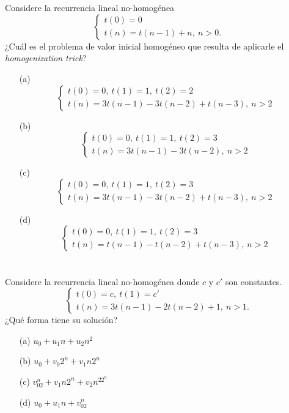 \documentclass{amsart}
\begin{document}
%

\section{} Considere la recurrencia lineal no-homogénea
\[
	\begin{cases}
		t(0)= 0\\
		t(n)= t(n-1) + n,\ n > 0.
	\end{cases}
\]
¿Cuál es el problema de valor inicial homogéneo que resulta de aplicarle el
\emph{homogenization trick}?
\begin{enumerate}
	\item[(a)]
		\[
			\begin{cases}
				t(0)= 0,\ t(1)= 1,\ t(2)= 2\\
				t(n)= 3t(n-1) - 3t(n-2) + t(n-3),\ n > 2
			\end{cases}
		\]
	\item[(b)]
		\[
			\begin{cases}
				t(0)= 0,\ t(1)= 1,\ t(2)= 3\\
				t(n)= 3t(n-1) - 3t(n-2),\ n > 2
			\end{cases}
		\]
	\item[(c)]
		\[
			\begin{cases}
				t(0)= 0,\ t(1)= 1,\ t(2)= 3\\
				t(n)= 3t(n-1) - 3t(n-2) + t(n-3),\ n > 2
			\end{cases}
		\]
	\item[(d)]
		\[
			\begin{cases}
				t(0)= 0,\ t(1)= 1,\ t(2)= 3\\
				t(n)= t(n-1) - t(n-2) + t(n-3),\ n > 2
			\end{cases}
		\]
\end{enumerate}

%

\section{} Considere la recurrencia lineal no-homogénea donde $c$ y
$c'$ son constantes.
\[
	\begin{cases}
		t(0)= c,\ t(1)= c'\\
		t(n)= 3t(n-1) - 2t(n-2) + 1,\ n > 1.
	\end{cases}
\]
¿Qué forma tiene su solución?
\begin{enumerate}
	\item[(a)] $u_0 + u_1n + u_2n^2$
	\item[(b)] $u_0 + v_0 2^n + v_1n2^n$
	\item[(c)] $v_02^n + v_1n2^n + v_2n^22^n$
	\item[(d)] $u_0 + u_1n + v_02^n$
\end{enumerate}
\end{document}
